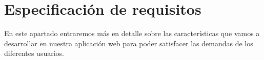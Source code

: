 \documentclass[10pt]{article}
\begin{document}
	\newpage
	\section{Especificación de requisitos}
	En este apartado entraremos más en detalle sobre las características que vamos a desarrollar en nuestra aplicación web para poder satisfacer las demandas de los diferentes usuarios.\\
	
	
	
	
	
	
	
\end{document}
